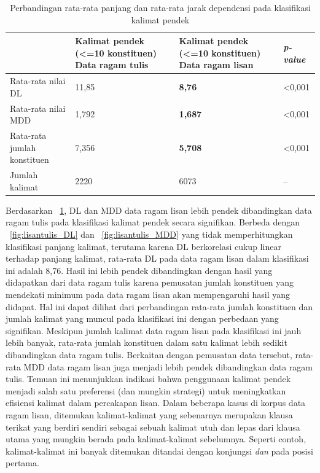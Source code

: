 \begin{table}
\begin{center}
\begin{small}
\caption{Perbandingan rata-rata panjang dan rata-rata jarak dependensi pada klasifikasi kalimat pendek }\label{tab:DL_MDD_pendek}
  \begin{tabular}{ | p{3.2cm} | p{3.2cm} | p{3.2cm} | p{2cm} |}
    \hline
 & Kalimat pendek \newline (\textless =10 konstituen) \newline Data ragam tulis & Kalimat pendek \newline (\textless =10 konstituen) \newline Data ragam lisan & \textit{p-value} \\ \hline
 Rata-rata nilai DL & 11,85 & \textbf{8,76} & \textless 0,001 \\ \hline
 Rata-rata nilai MDD & 1,792 & \textbf{1,687} & \textless 0,001 \\ \hline
 Rata-rata jumlah konstituen & 7,356 & \textbf{5,708} & \textless 0,001 \\ \hline
 Jumlah kalimat & 2220 & 6073 & -- \\ \hline
   \end{tabular}
   \end{small}
\end{center}
\end{table}

Berdasarkan \tab~\ref{tab:DL_MDD_pendek}, DL dan MDD data ragam lisan lebih pendek dibandingkan data ragam tulis pada klasifikasi kalimat pendek secara signifikan. Berbeda dengan \pic~\ref{fig:lisantulis_DL}  dan \pic~\ref{fig:lisantulis_MDD} yang tidak memperhitungkan klasifikasi panjang kalimat, terutama karena DL berkorelasi cukup linear terhadap panjang kalimat, rata-rata DL pada data ragam lisan dalam klasifikasi ini adalah 8,76. Hasil ini lebih pendek dibandingkan dengan hasil yang didapatkan dari data ragam tulis karena pemusatan jumlah konstituen yang mendekati minimum pada data ragam lisan akan mempengaruhi hasil yang didapat. Hal ini dapat dilihat dari perbandingan rata-rata jumlah konstituen dan jumlah kalimat yang muncul pada klasifikasi ini dengan perbedaan yang signifikan. Meskipun jumlah kalimat data ragam lisan pada klasifikasi ini jauh lebih banyak, rata-rata jumlah konstituen dalam satu kalimat lebih sedikit dibandingkan data ragam tulis.  Berkaitan dengan pemusatan data tersebut, rata-rata MDD data ragam lisan juga menjadi lebih pendek dibandingkan data ragam tulis. Temuan ini menunjukkan indikasi bahwa penggunaan kalimat pendek menjadi salah satu preferensi (dan mungkin strategi)  untuk meningkatkan efisiensi kalimat dalam percakapan lisan. Dalam beberapa kasus di korpus data ragam lisan, ditemukan kalimat-kalimat yang sebenarnya merupakan klausa terikat yang berdiri sendiri sebagai sebuah kalimat utuh dan lepas dari klausa utama yang mungkin berada pada kalimat-kalimat sebelumnya. Seperti contoh, kalimat-kalimat ini banyak ditemukan ditandai dengan konjungsi \textit{dan} pada posisi pertama. 

